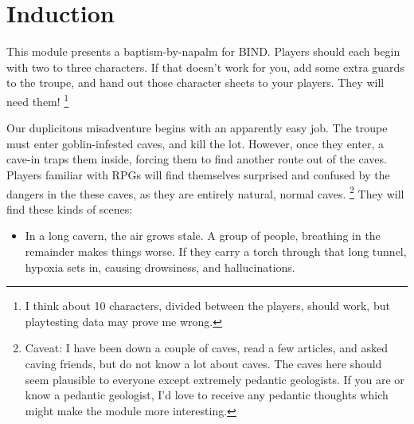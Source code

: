 \section{Induction}

\begin{multicols}{2}

\noindent
This module presents a baptism-by-napalm for BIND.
Players should each begin with two to three characters.
If that doesn't work for you, add some extra \glspl{guard} to the troupe, and hand out those character sheets to your players.
They will need them!%
\footnote{I think about 10 characters, divided between the players, should work, but playtesting data may prove me wrong.}

Our duplicitous misadventure begins with an apparently easy job.
The troupe must enter goblin-infested caves, and kill the lot.
However, once they enter, a cave-in traps them inside, forcing them to find another route out of the caves.
Players familiar with RPGs will find themselves surprised and confused by the dangers in the these caves, as they are entirely natural, normal caves.%
\footnote{Caveat: I have been down a couple of caves, read a few articles, and asked caving friends, but do not know a lot about caves.
The caves here should seem plausible to everyone except extremely pedantic geologists.
If you are or know a pedantic geologist, I'd love to receive any pedantic thoughts which might make the module more interesting.}
They will find these kinds of scenes:

\begin{itemize}
	\item
	In a long cavern, the air grows stale.
	A group of people, breathing in the remainder makes things worse.
	If they carry a torch through that long tunnel, hypoxia sets in, causing drowsiness, and hallucinations.


\end{itemize}
\end{multicols}
